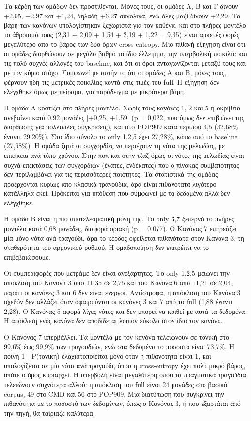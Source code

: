 Τα κέρδη των ομάδων δεν προστίθενται. Μόνες τους, οι ομάδες Α, Β και Γ δίνουν +2,05, +2,97 και +1,24, δηλαδή +6,27 συνολικά, ενώ όλες μαζί δίνουν +2,29. Τα βάρη των κανόνων υπολογίστηκαν ξεχωριστά για τον καθένα, και στο πλήρες μοντέλο το άθροισμά τους (2,31 + 2,09 + 1,54 + 2,19 + 1,22 = 9,35) είναι αρκετές φορές μεγαλύτερο από το βάρος των δύο όρων cross-entropy. Μια πιθανή εξήγηση είναι ότι οι ομάδες διορθώνουν σε μεγάλο βαθμό το ίδιο έλλειμμα, την υπερβολική ποικιλία και τις πολύ συχνές αλλαγές του baseline, και ότι οι όροι ανταγωνίζονται μεταξύ τους και με τον κύριο στόχο. Συμφωνεί με αυτήν το ότι οι ομάδες Α και Β, μόνες τους, φέρνουν ήδη τις μετρικές ποικιλίας κοντά στις τιμές του full. Η εξήγηση δεν ελέγχθηκε όμως με πείραμα, για παράδειγμα με μικρότερα βάρη.

Η ομάδα Α κοστίζει στο πλήρες μοντέλο. Χωρίς τους κανόνες 1, 2 και 5 η ακρίβεια ανεβαίνει κατά 0,92 μονάδες [+0,25, +1,59] (p = 0,022, που όμως δεν επιβιώνει της διόρθωσης για πολλαπλές συγκρίσεις), και στο POP909 κατά περίπου 3,5 (32,68\% έναντι 29,20\%). Στο ίδιο σύνολο το only {1,2,5} έχει 27,28\%, κάτω από το baseline (27,68\%). Η ομάδα ζητά οι συγχορδίες να περιέχουν τη νότα της μελωδίας, με επιείκεια ανά τύπο χρόνου. Στην ποπ και στην τζαζ όμως οι νότες της μελωδίας είναι συχνά επεκτάσεις των συγχορδιών (ένατες, ενδέκατες) που ο πίνακας συμβατότητας δεν περιλαμβάνει για τις περισσότερες ποιότητες. Τα στατιστικά της ομάδας προέρχονται κυρίως από κλασικά τραγούδια, άρα είναι πιθανότατα λιγότερο κατάλληλα εκεί. Πρόκειται για υπόθεση που συμφωνεί με τα δεδομένα αλλά δεν ελέγχθηκε. 

Η ομάδα Β είναι η πιο αποτελεσματική μόνη της. Το only {3,7} ξεπερνά το πλήρες μοντέλο κατά 0,68 μονάδες, διαφορά οριακή (p = 0,077). Ο Κανόνας 7 επηρεάζει μία μόνο νότα ανά τραγούδι, άρα το κέρδος οφείλεται πιθανότατα στον Κανόνα 3, τη σταθερότητα του αρμονικού ρυθμού. Η ομαδοποίηση δεν επιτρέπει να το επιβεβαιώσουμε.

Οι συμπεριφορές που μετράμε δεν είναι ανεξάρτητες. Το only {1,2,5} μειώνει την απόκλιση του Κανόνα 3 από 11,35 σε 2,75 και του Κανόνα 6 από 11,21 σε 2,04, παρότι οι κανόνες 3 και 6 δεν είναι ενεργοί. Αντίστροφα, η απόκλιση του Κανόνα 3 σχεδόν δεν αλλάζει όταν αφαιρούνται οι κανόνες 3 και 7 από το full (1,88 έναντι 2,28). Ο Κανόνας 5 αφορά λίγες νότες και δεν μπορεί να κριθεί με αυτά τα δεδομένα. Η απόκλιση ενός κανόνα δεν αποδίδεται λοιπόν εύκολα στον ίδιο τον κανόνα.

Ο Κανόνας 7 υπερβάλλει. Τα μοντέλα με τον κανόνα τελειώνουν σε τονική στο 99,6\% έως 99,9\% των τραγουδιών, ενώ στα δεδομένα το ποσοστό είναι 73,7\%. Η ποινή 1 - P(τονική) ελαχιστοποιείται μόνο όταν η πιθανότητα είναι 1, και υπολογίζεται σε μία νότα ανά τραγούδι, όπου η cross-entropy έχει πολύ μικρό βάρος, οπότε ο όρος κυριαρχεί. Η υπερβολή είναι μεγαλύτερη όπου τα πραγματικά τραγούδια τελειώνουν συχνότερα αλλού: η απόκλιση του full είναι 24 μονάδες στο βασικό corpus, 49 στο CMD και 56 στο POP909. Μια διατύπωση που συγκρίνει την πιθανότητα με το ποσοστό των δεδομένων, όπως ο Κανόνας 3, ή που εξαρτάται από την πηγή, θα ταίριαζε καλύτερα.

